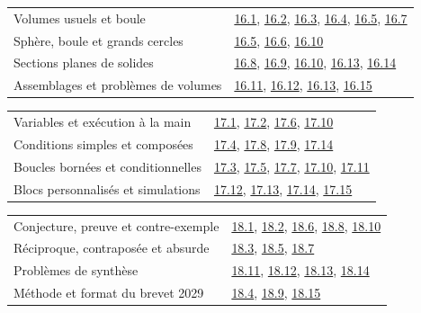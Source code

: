 \begin{tabularx}{\linewidth}{@{}Yl@{}}\toprule
Volumes usuels et boule & \hyperref[exo-16-1]{16.1}, \hyperref[exo-16-2]{16.2}, \hyperref[exo-16-3]{16.3}, \hyperref[exo-16-4]{16.4}, \hyperref[exo-16-5]{16.5}, \hyperref[exo-16-7]{16.7}\\[2mm]
Sphère, boule et grands cercles & \hyperref[exo-16-5]{16.5}, \hyperref[exo-16-6]{16.6}, \hyperref[exo-16-10]{16.10}\\[2mm]
Sections planes de solides & \hyperref[exo-16-8]{16.8}, \hyperref[exo-16-9]{16.9}, \hyperref[exo-16-10]{16.10}, \hyperref[exo-16-13]{16.13}, \hyperref[exo-16-14]{16.14}\\[2mm]
Assemblages et problèmes de volumes & \hyperref[exo-16-11]{16.11}, \hyperref[exo-16-12]{16.12}, \hyperref[exo-16-13]{16.13}, \hyperref[exo-16-15]{16.15}\\[2mm]
\bottomrule\end{tabularx}\par\vspace{4mm}
\begin{tabularx}{\linewidth}{@{}Yl@{}}\toprule
Variables et exécution à la main & \hyperref[exo-17-1]{17.1}, \hyperref[exo-17-2]{17.2}, \hyperref[exo-17-6]{17.6}, \hyperref[exo-17-10]{17.10}\\[2mm]
Conditions simples et composées & \hyperref[exo-17-4]{17.4}, \hyperref[exo-17-8]{17.8}, \hyperref[exo-17-9]{17.9}, \hyperref[exo-17-14]{17.14}\\[2mm]
Boucles bornées et conditionnelles & \hyperref[exo-17-3]{17.3}, \hyperref[exo-17-5]{17.5}, \hyperref[exo-17-7]{17.7}, \hyperref[exo-17-10]{17.10}, \hyperref[exo-17-11]{17.11}\\[2mm]
Blocs personnalisés et simulations & \hyperref[exo-17-12]{17.12}, \hyperref[exo-17-13]{17.13}, \hyperref[exo-17-14]{17.14}, \hyperref[exo-17-15]{17.15}\\[2mm]
\bottomrule\end{tabularx}\par\vspace{4mm}
\begin{tabularx}{\linewidth}{@{}Yl@{}}\toprule
Conjecture, preuve et contre-exemple & \hyperref[exo-18-1]{18.1}, \hyperref[exo-18-2]{18.2}, \hyperref[exo-18-6]{18.6}, \hyperref[exo-18-8]{18.8}, \hyperref[exo-18-10]{18.10}\\[2mm]
Réciproque, contraposée et absurde & \hyperref[exo-18-3]{18.3}, \hyperref[exo-18-5]{18.5}, \hyperref[exo-18-7]{18.7}\\[2mm]
Problèmes de synthèse & \hyperref[exo-18-11]{18.11}, \hyperref[exo-18-12]{18.12}, \hyperref[exo-18-13]{18.13}, \hyperref[exo-18-14]{18.14}\\[2mm]
Méthode et format du brevet 2029 & \hyperref[exo-18-4]{18.4}, \hyperref[exo-18-9]{18.9}, \hyperref[exo-18-15]{18.15}\\[2mm]
\bottomrule\end{tabularx}\par\vspace{4mm}
\clearpage
